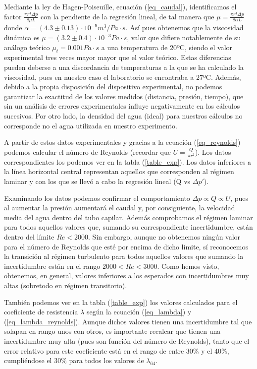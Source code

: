 Mediante la ley de Hagen-Poiseuille, ecuación (\ref{eq_caudal}), identificamos el factor $\frac{\pi r^4 \Delta p}{8\mu L}$ con la pendiente de la regresión lineal, de tal manera que $\mu = \frac{\pi r^4 \Delta p}{8\alpha L}$ donde $\alpha = (4.3 \pm 0.13)\cdot 10^{-9}m^3/Pa\cdot s$. Así pues obtenemos que la viscosidad dinámica es $\mu = (3.2 \pm 0.4) \cdot 10^{-3} Pa \cdot s$, valor que difiere notablemente de su análogo teórico $\mu_t = 0.001 Pa \cdot s$ a una temperatura de 20ºC, siendo el valor experimental tres veces mayor mayor que el valor teórico. Estas diferencias pueden deberse a una discordancia de temperaturas a la que se ha calculado la viscosidad, pues en nuestro caso el laboratorio se encontraba a 27ºC. Además, debido a la propia disposición del dispositivo experimental, no podemos garantizar la exactitud de los valores medidos (distancia, presión, tiempo), que sin un análisis de errores experimentales influye negativamente en los cálculos sucesivos. Por otro lado, la densidad del agua (ideal) para nuestros cálculos no corresponde no el agua utilizada en nuestro experimento.

A partir de estos datos experimentales y gracias a la ecuación (\ref{eq_reynolds}) podemos calcular el número de Reynolds (recordar que $U = \frac{Q}{\pi r^2}$). Los datos correspondientes los podemos ver en la tabla (\ref{table_exp}). Los datos inferiores a la línea horizontal central representan aquellos que corresponden al régimen laminar y con los que se llevó a cabo la regresión lineal (Q vs $\Delta p'$). 

Examinando los datos podemos confirmar el comportamiento $\Delta p \propto Q \propto U$, pues al aumentar la presión aumentará el caudal y, por consiguiente, la velocidad media del agua dentro del tubo capilar. Además comprobamos el régimen laminar para todos aquellos valores que, sumando su correspondiente incertidumbre, están dentro del límite $Re < 2000$. Sin embargo, aunque no obtenemos ningún valor para el número de Reynolds que esté por encima de dicho límite, sí reconocemos la transición al régimen turbulento para todos aquellos valores que sumando la incertidumbre están en el rango $2000<Re<3000$. Como hemos visto, obtenemos, en general, valores inferiores a los esperados con incertidumbres muy altas (sobretodo en régimen transitorio).

También podemos ver en la tabla (\ref{table_exp}) los valores calculados para el coeficiente de resistencia $\lambda$ según la ecuación (\ref{eq_lambda}) y (\ref{eq_lambda_reynolds}). Aunque dichos valores tienen una incertidumbre tal que solapan en rango unos con otros, es importante recalcar que tienen una incertidumbre muy alta (pues son función del número de Reynolds), tanto que el error relativo para este coeficiente está en el rango de entre 30\% y el 40\%, cumpliéndose el 30\% para todos los valores de $\lambda_{64}$. 

